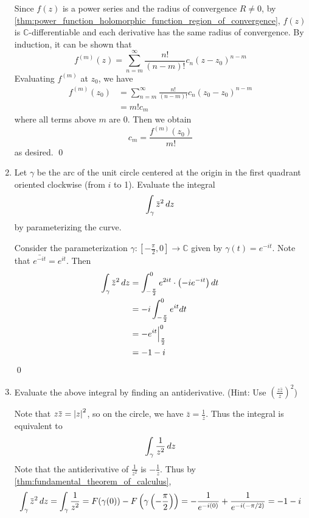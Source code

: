 \documentclass[notoc,notitlepage]{tufte-book}
\begin{document}
\begin{enumerate}
		\begin{solution}
			Since $f(z)$ is a power series and the radius of convergence $R \neq 0$, by \cref{thm:power_function_holomorphic_function_region_of_convergence}, $f(z)$ is $\mathbb{C}$-differentiable and each derivative has the same radius of convergence. By induction, it can be shown that
			\begin{equation*}
				f^{(m)}(z) = \sum_{n=m}^{\infty} \frac{n!}{(n - m)!} c_n (z - z_0)^{n - m} 
			\end{equation*}
			Evaluating $f^{(m)}$ at $z_0$, we have
			\begin{align*}
				f^{(m)}(z_0)
					&= \sum_{n=m}^{\infty} \frac{n!}{(n - m)!} c_n (z_0 - z_0)^{n - m} \\
					&= m! c_m
			\end{align*}
			where all terms above $m$ are 0. Then we obtain
			\begin{equation*}
				c_m = \frac{f^{(m)}(z_0)}{m!}
			\end{equation*}
			as desired. \qed
		\end{solution}
	\item Let $\gamma$ be the arc of the unit circle centered at the origin in the first quadrant oriented clockwise (from $i$ to 1). Evaluate the integral
		\begin{equation*}
			\int_{\gamma} \bar{z}^2 \dif{z}
		\end{equation*}
		by parameterizing the curve.

		\begin{solution}
			Consider the parameterization $\gamma: [ -\frac{\pi}{2}, 0 ] \to \mathbb{C}$ given by $\gamma(t) = e^{-it}$. Note that $\bar{e^{-it}} = e^{it}$. Then
			\begin{align*}
				\int_{\gamma} \bar{z}^2 \dif{z}
					&= \int_{-\frac{\pi}{2}}^{0} e^{2it} \cdot \left( -i e^{-it} \right) dt \\
					&= -i \int_{-\frac{\pi}{2}}^{0} e^{it} dt \\
					&= -e^{it} \at{\frac{\pi}{2}}{0} \\
					&= - 1 - i
			\end{align*}\qed
		\end{solution}
	\item Evaluate the above integral by finding an antiderivative. (Hint: Use $\left(\frac{z\bar{z}}{z} \right)^2$)
		\begin{solution}
			Note that $z\bar{z} = \abs{z}^2$, so on the circle, we have $\bar{z} = \frac{1}{z}$. Thus the integral is equivalent to
			\begin{equation*}
				\int_{\gamma} \frac{1}{z^2} \mathop{}\!d{z}
			\end{equation*}
			Note that the antiderivative of $\frac{1}{z^2}$ is $-\frac{1}{z}$. Thus by \cref{thm:fundamental_theorem_of_calculus},
			\begin{equation*}
				\int_{\gamma} \bar{z}^2 \dif{z} = \int_{\gamma} \frac{1}{z^2} = F(\gamma(0)) - F\left(\gamma\left(-\frac{\pi}{2}\right)\right) = -\frac{1}{e^{-i(0)}} + \frac{1}{e^{-i(-\pi/2)}} = - 1 - i 
			\end{equation*}
		\end{solution}


\end{enumerate}
\end{document}
